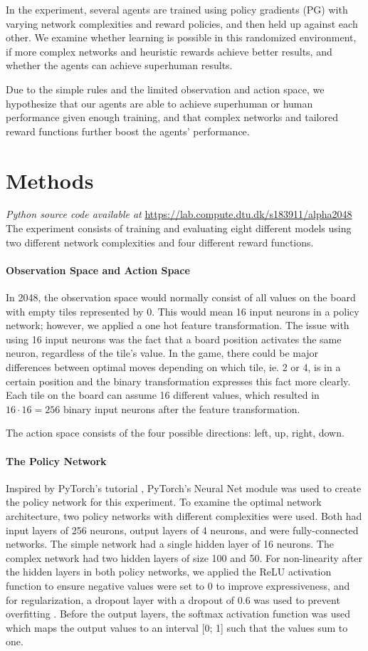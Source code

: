 \documentclass[11pt, fleqn]{article}
\begin{document}
In the experiment, several agents are trained using policy gradients (PG) with varying network complexities and reward policies, and then held up against each other. We examine whether learning is possible in this randomized environment, if more complex networks and heuristic rewards achieve better results, and whether the agents can achieve superhuman results.

Due to the simple rules and the limited observation and action space, we hypothesize that our agents are able to achieve superhuman or human performance given enough training, and that complex networks and tailored reward functions further boost the agents' performance.
\section{Methods}
\textit{Python source code available at} \url{https://lab.compute.dtu.dk/s183911/alpha2048}\\
The experiment consists of training and evaluating eight different models using two different network complexities and four different reward functions.
\paragraph{Observation Space and Action Space}
In 2048, the observation space would normally consist of all values on the board with empty tiles represented by 0. This would mean 16 input neurons in a policy network; however, we applied a one hot feature transformation. The issue with using 16 input neurons was the fact that a board position  activates the same neuron, regardless of the tile's value. In the game, there could be major differences between optimal moves depending on which tile, ie. 2 or 4, is in a certain position and the binary transformation expresses this fact more clearly. Each tile on the board can assume 16 different values, which resulted in $ 16\cdot 16=256 $ binary input neurons after the feature transformation.

The action space consists of the four possible directions: left, up, right, down.
\paragraph*{The Policy Network}
Inspired by PyTorch's tutorial \cite{Torch}, PyTorch's Neural Net module was used to create the policy network for this experiment. To examine the optimal network architecture, two policy networks with different complexities were used. Both had input layers of 256 neurons, output layers of 4 neurons, and were fully-connected networks. The simple network had a single hidden layer of 16 neurons. The complex network had two hidden layers of size 100 and 50. For non-linearity after the hidden layers in both policy networks, we applied the ReLU activation function to ensure negative values were set to 0 to improve expressiveness, and for regularization, a dropout layer with a dropout of 0.6 was used to prevent overfitting \cite{Sri}. Before the output layers, the softmax activation function was used which maps the output values to an interval [0; 1] such that the values sum to one. 
\end{document}

